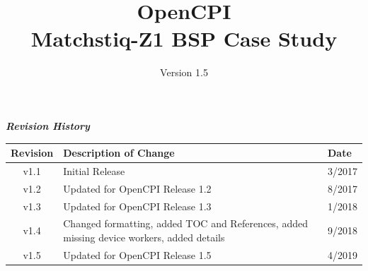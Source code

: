 \def\docTitle{OpenCPI\\ Matchstiq-Z1 BSP Case Study}
\def\docVersion{1.5}

\date{Version \docVersion} %
\title{\docTitle}
\usepackage[T1]{fontenc} %
\usepackage{graphicx}
\graphicspath{ {figures/} }
\usepackage{textcomp}

\maketitle
\newpage

	\begin{center}
	\textit{\textbf{Revision History}}
		\begin{table}[H]
		\label{table:revisions} %
			\begin{tabularx}{\textwidth}{|c|X|l|}
			\hline
			\rowcolor{blue}
			\textbf{Revision} & \textbf{Description of Change} & \textbf{Date} \\
		    \hline
		    v1.1 & Initial Release & 3/2017 \\
		    \hline
		    v1.2 & Updated for OpenCPI Release 1.2 & 8/2017 \\
			\hline
			v1.3 & Updated for OpenCPI Release 1.3 & 1/2018 \\
			\hline
			v1.4 & Changed formatting, added TOC and References, added missing device workers, added details & 9/2018 \\
			\hline
			v1.5 & Updated for OpenCPI Release 1.5 & 4/2019 \\
			\hline
			\end{tabularx}
		\end{table}
	\end{center}

